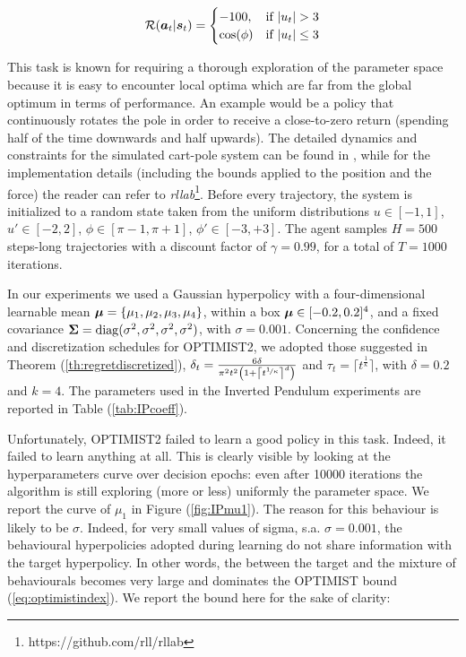 \begin{equation}
\Rew(\boldsymbol{a}_t|\boldsymbol{s}_t)= \begin{cases}-100, &\text{if $|u_t|>3$} \\ \cos(\phi) &\text{if $|u_t|\leq3$} \end{cases}
\end{equation}

This task is known for requiring a thorough exploration of the parameter space because it is easy to encounter local optima which are far from the global optimum in terms of performance. An example would be a policy that continuously rotates the pole in order to receive a close-to-zero return (spending half of the time downwards and half upwards). The detailed dynamics and constraints for the simulated cart-pole system can be found in \cite{kimura1999efficient}, while for the implementation details (including the bounds applied to the position and the force) the reader can refer to \emph{rllab}\footnote{https://github.com/rll/rllab}. Before every trajectory, the system is initialized to a random state taken from the uniform distributions $u\in[-1,1]$, $u'\in[-2,2]$, $\phi\in[\pi-1,\pi+1]$, $\phi'\in[-3,+3]$. The agent samples $H=500$ steps-long trajectories with a discount factor of $\gamma=0.99$, for a total of $T=1000$ iterations.

In our experiments we used a Gaussian hyperpolicy with a four-dimensional learnable mean $\boldsymbol{\mu}=\{\mu_1, \mu_2, \mu_3, \mu_4\}$, within a box $\boldsymbol{\mu}\in[-0.2,0.2]^4$, and a fixed covariance $\boldsymbol{\Sigma}=\mathrm{diag}(\sigma^2,\sigma^2,\sigma^2,\sigma^2)$, with $\sigma=0.001$. Concerning the confidence and discretization schedules for \gls{OPTIMIST}2, we adopted those suggested in Theorem (\ref{th:regretdiscretized}), \ie ${\delta_t = \frac{6\delta}{\pi^2t^2\left(1+\left\lceil t^{\nicefrac{1}{\kappa}}\right\rceil^d\right)}}$ and $\tau_t=\lceil t^{\frac{1}{\kappa}} \rceil$, with $\delta=0.2$ and $k=4$. The parameters used in the Inverted Pendulum experiments are reported in Table (\ref{tab:IPcoeff}).

Unfortunately, \gls{OPTIMIST}2 failed to learn a good policy in this task.  Indeed, it failed to learn anything at all. This is clearly visible by looking at the hyperparameters curve over decision epochs: even after 10000 iterations the algorithm is still exploring (more or less) uniformly the parameter space. We report the curve of $\mu_1$ in Figure (\ref{fig:IPmu1}). The reason for this behaviour is likely to be $\sigma$. Indeed, for very small values of sigma, s.a. $\sigma=0.001$, the behavioural hyperpolicies adopted during learning do not share information with the target hyperpolicy. In other words, the \Renyi between the target and the mixture of behaviourals becomes very large and dominates the \gls{OPTIMIST} bound (\ref{eq:optimistindex}). We report the bound here for the sake of clarity:

